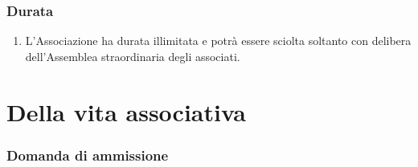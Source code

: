 \documentclass{djtsdoc}
\begin{document}
	\section{Durata}
	\begin{enumerate}
		\item L'Associazione ha durata illimitata e potrà essere sciolta soltanto con delibera dell'Assemblea straordinaria degli associati.
	\end{enumerate}
	
	\part{Della vita associativa}
	\section{Domanda di ammissione}
\end{document}
